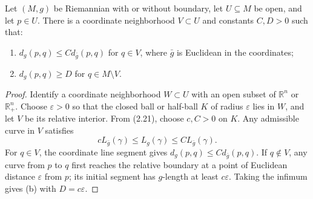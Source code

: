 \begin{lemma}\label{lem:distance-comparison-neighborhood}





Let $(M,g)$ be Riemannian with or without boundary, let $U\subseteq M$ be open, and let $p\in U$. There is a coordinate neighborhood $V\subset U$ and constants $C,D>0$ such that:
\begin{enumerate}
\item[(a)] $d_g(p,q)\le C d_{\bar g}(p,q)$ for $q\in V$, where $\bar g$ is Euclidean in the coordinates;
\item[(b)] $d_g(p,q)\ge D$ for $q\in M\setminus V$.
\end{enumerate}
\begin{proof}


\sketch Identify a coordinate neighborhood $W\subset U$ with an open subset of $\mathbb R^n$ or $\mathbb R^n_+$. Choose $\varepsilon>0$ so that the closed ball or half-ball $K$ of radius $\varepsilon$ lies in $W$, and let $V$ be its relative interior. From (2.21), choose $c,C>0$ on $K$. Any admissible curve in $V$ satisfies
\[
cL_{\bar g}(\gamma)\le L_g(\gamma)\le CL_{\bar g}(\gamma).\tag{2.22}
\]
For $q\in V$, the coordinate line segment gives $d_g(p,q)\le C d_{\bar g}(p,q)$. If $q\notin V$, any curve from $p$ to $q$ first reaches the relative boundary at a point of Euclidean distance $\varepsilon$ from $p$; its initial segment has $g$-length at least $c\varepsilon$. Taking the infimum gives (b) with $D=c\varepsilon$.
\end{proof}
\end{lemma}


